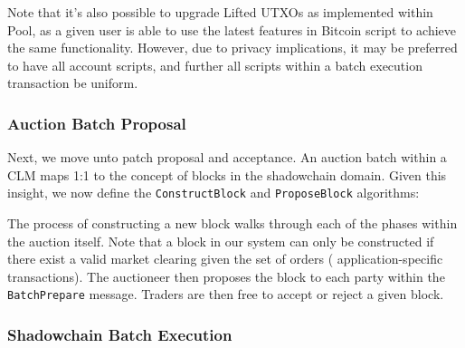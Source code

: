 \documentclass[10pt,a4paper]{article}
\theoremstyle{definition}
\begin{document}
Note that it's also possible to upgrade Lifted UTXOs as implemented within
Pool, as a given user is able to use the latest features in Bitcoin script to
achieve the same functionality. However, due to privacy implications, it may be
preferred to have all account scripts, and further all scripts within a batch
execution transaction be uniform.

\subsubsection{Auction Batch Proposal}

Next, we move unto patch proposal and acceptance. An auction batch within a CLM
maps 1:1 to the concept of blocks in the shadowchain domain. Given this
insight, we now define the \texttt{ConstructBlock} and \texttt{ProposeBlock}
algorithms:

\begin{pchstack}[boxed,center, space=1em]

\end{pchstack}

The process of constructing a new block walks through each of the phases within
the auction itself. Note that a block in our system can only be constructed if
there exist a valid market clearing given the set of orders
( application-specific transactions). The auctioneer then proposes the block to
each party within the \texttt{BatchPrepare} message. Traders are then free to
accept or reject a given block. 


\subsubsection{Shadowchain Batch Execution}
\end{document}
